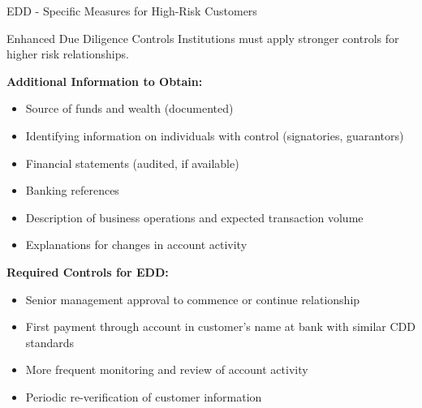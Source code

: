 \documentclass[11pt,a4paper]{beamer}
\begin{document}
	\begin{frame}{EDD - Specific Measures for High-Risk Customers}
		\begin{block}{Enhanced Due Diligence Controls}
			Institutions must apply stronger controls for higher risk relationships.
		\end{block}
		\textbf{Additional Information to Obtain:}
		\begin{itemize}
			\item Source of funds and wealth (documented)
			\item Identifying information on individuals with control (signatories, guarantors)
			\item Financial statements (audited, if available)
			\item Banking references
			\item Description of business operations and expected transaction volume
			\item Explanations for changes in account activity
		\end{itemize}
		\textbf{Required Controls for EDD:}
		\begin{itemize}
			\item Senior management approval to commence or continue relationship
			\item First payment through account in customer's name at bank with similar CDD standards
			\item More frequent monitoring and review of account activity
			\item Periodic re-verification of customer information
		\end{itemize}
	\end{frame}
	
\end{document}
